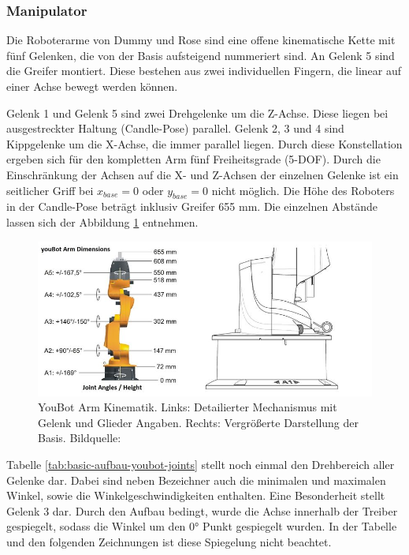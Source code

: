 \subsubsection{Manipulator}
 Die Roboterarme von Dummy und Rose sind eine offene kinematische Kette mit fünf Gelenken, die von der Basis aufsteigend nummeriert sind. An Gelenk 5 sind die Greifer montiert. Diese bestehen aus zwei individuellen Fingern, die linear auf einer Achse bewegt werden können.

Gelenk 1 und Gelenk 5 sind zwei Drehgelenke um die Z-Achse. Diese liegen bei ausgestreckter Haltung (Candle-Pose) parallel. Gelenk 2, 3 und 4 sind Kippgelenke um die X-Achse, die immer parallel liegen. Durch diese Konstellation ergeben sich für den kompletten Arm fünf Freiheitsgrade (5-DOF). Durch die Einschränkung der Achsen auf die X- und Z-Achsen der einzelnen Gelenke ist ein seitlicher Griff bei $x_{base} = 0$ oder $y_{base} = 0$ nicht möglich. Die Höhe des Roboters in der Candle-Pose beträgt inklusiv Greifer 655 mm. Die einzelnen Abstände lassen sich der Abbildung \ref{fig:basic-aufbau-youbot-kinematik} entnehmen.

\begin{figure}[H]
	\centering
	\includegraphics[scale=0.8]{fig/kukaarm_1}   
	\caption[YouBot Arm Kinematik]{YouBot Arm Kinematik. Links: Detailierter Mechanismus mit Gelenk und Glieder Angaben. Rechts: Vergrößerte Darstellung der Basis. Bildquelle: \cite{monikaflorekjasinska2015}}
	\label{fig:basic-aufbau-youbot-kinematik}
\end{figure}



 
 Tabelle \ref{tab:basic-aufbau-youbot-joints} stellt noch einmal den Drehbereich aller Gelenke dar. Dabei sind neben Bezeichner auch die minimalen und maximalen Winkel, sowie die Winkelgeschwindigkeiten enthalten. Eine Besonderheit stellt Gelenk 3 dar. Durch den Aufbau bedingt, wurde die Achse innerhalb der Treiber gespiegelt, sodass die Winkel um den 0° Punkt gespiegelt wurden. In der Tabelle und den folgenden Zeichnungen ist diese Spiegelung nicht beachtet.
 
